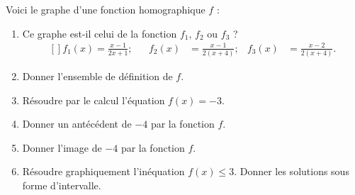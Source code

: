 
\begin{exercice}\label{exosmath-0721}


    Voici le graphe d'une fonction homographique \( f\) :

\begin{center}
   
\end{center}

\begin{enumerate}
    \item
        Ce graphe est-il celui de la fonction \( f_1\), \( f_2\) ou \( f_3\) ?
        \begin{equation}
            \begin{aligned}[]
                f_1(x)=\frac{ x-1 }{ 2x+1 };&&f_2(x)&=\frac{ x-1 }{ 2(x+4) };&f_3(x)&=\frac{ x-2 }{ 2(x+4) }.
            \end{aligned}
        \end{equation}
    \item
        Donner l'ensemble de définition de \( f\).
    \item
        Résoudre par le calcul l'équation \( f(x)=-3\).
    \item
        Donner un antécédent de \( -4\) par la fonction \( f\).
    \item
        Donner l'image de \( -4\) par la fonction \( f\).
    \item
        Résoudre graphiquement l'inéquation \( f(x)\leq 3\). Donner les solutions sous forme d'intervalle.
\end{enumerate}



\end{exercice}
